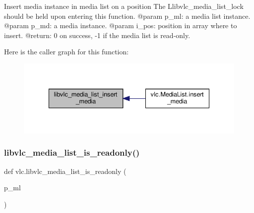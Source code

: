 \begin{DoxyVerb}Insert media instance in media list on a position
The L{libvlc_media_list_lock} should be held upon entering this function.
@param p_ml: a media list instance.
@param p_md: a media instance.
@param i_pos: position in array where to insert.
@return: 0 on success, -1 if the media list is read-only.
\end{DoxyVerb}
 Here is the caller graph for this function\+:
\nopagebreak
\begin{figure}[H]
\begin{center}
\leavevmode
\includegraphics[width=335pt]{namespacevlc_ad202a19648373b42178fdb688b342e63_icgraph}
\end{center}
\end{figure}
\mbox{\label{namespacevlc_a3ce52be946efb72c7364aaf27e35d43d}} 
\subsubsection{\texorpdfstring{libvlc\+\_\+media\+\_\+list\+\_\+is\+\_\+readonly()}{libvlc\_media\_list\_is\_readonly()}}
{\footnotesize\ttfamily def vlc.\+libvlc\+\_\+media\+\_\+list\+\_\+is\+\_\+readonly (\begin{DoxyParamCaption}\item[{}]{p\+\_\+ml }\end{DoxyParamCaption})}

